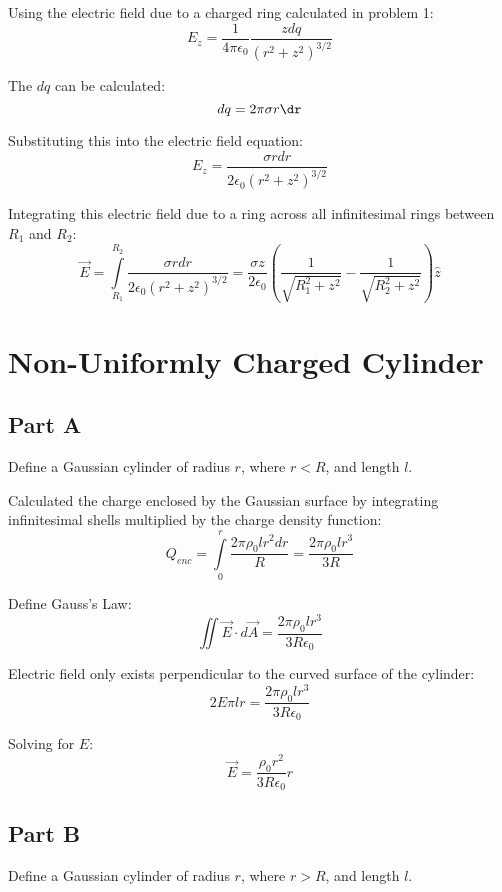 \documentclass{article}
\begin{document}
Using the electric field due to a charged ring calculated in problem
1:
$$ E_{z} = \frac{ 1 }{ 4 \pi \epsilon_0 } \frac{ z dq }{ \left( r^{2} + z^{2}
\right)^{3/2} } $$

The $dq$ can be calculated:
$$ dq = 2 \pi \sigma r \dr $$

Substituting this into the electric field equation:
$$ E_{z} = \frac{ \sigma r dr  }{ 2 \epsilon_0 \left( r^{2} + z^{2} \right)^{3/2} } $$

Integrating this electric field due to a ring across all infinitesimal rings
between $R_{1}$ and $R_{2}$:
$$ \vec{E} = \int\limits_{R_{1}}^{R_{2}} \frac{ \sigma r dr }{ 2 \epsilon_{0}
\left( r^{2} + z^{2} \right)^{3/2} } = \frac{ \sigma z }{ 2 \epsilon_0 } \left(
\frac{ 1 }{ \sqrt{R_{1}^{2} + z^{2}} } - \frac{ 1 }{ \sqrt{R^{2}_{2} + z^{2}}
}\right) \hat{z} $$

\section{Non-Uniformly Charged Cylinder}

\subsection*{Part A}

Define a Gaussian cylinder of radius $r$, where $r < R$, and length $l$.

\bigbreak

Calculated the charge enclosed by the Gaussian surface by integrating
infinitesimal shells multiplied by the charge density function:
$$ Q_{enc} = \int\limits_{0}^{r} \frac{ 2 \pi \rho_{0} l r^{2} dr }{ R } = \frac{ 2
\pi \rho_{0} l r^{3}}{ 3 R }$$

Define Gauss's Law:
$$ \iint \vec{E} \cdot d\vec{A} = \frac{ 2 \pi \rho_{0} l r^{3}}{ 3 R
\epsilon_{0} }$$

Electric field only exists perpendicular to the curved surface of the cylinder:
$$ 2 E \pi l r = \frac{ 2 \pi \rho_{0} l r^{3}}{ 3 R \epsilon_{0} } $$

Solving for $E$:
$$ \vec{E} = \frac{ \rho_{0} r^{2} }{ 3 R \epsilon_0 } \hat{r} $$

\subsection*{Part B}

Define a Gaussian cylinder of radius $r$, where $r > R$, and length $l$.
\end{document}
